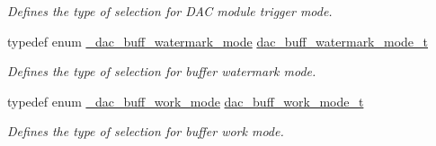 \begin{DoxyCompactItemize}
\begin{DoxyCompactList}\small\item\em Defines the type of selection for D\+AC module trigger mode. \end{DoxyCompactList}\item 
typedef enum \hyperlink{group__dac__hal_gaca326abf4ffaa1ea20eb364e519361a0}{\+\_\+dac\+\_\+buff\+\_\+watermark\+\_\+mode} \hyperlink{group__dac__hal_ga31cd37ee3901ceda4014e7c5301a8ea1}{dac\+\_\+buff\+\_\+watermark\+\_\+mode\+\_\+t}
\begin{DoxyCompactList}\small\item\em Defines the type of selection for buffer watermark mode. \end{DoxyCompactList}\item 
typedef enum \hyperlink{group__dac__hal_gaf2d8ceb9806aee0678374a5ca01aaae4}{\+\_\+dac\+\_\+buff\+\_\+work\+\_\+mode} \hyperlink{group__dac__hal_ga3d2ac50178e33d5ce3529f4e9af80b8b}{dac\+\_\+buff\+\_\+work\+\_\+mode\+\_\+t}
\begin{DoxyCompactList}\small\item\em Defines the type of selection for buffer work mode. \end{DoxyCompactList}\end{DoxyCompactItemize}
